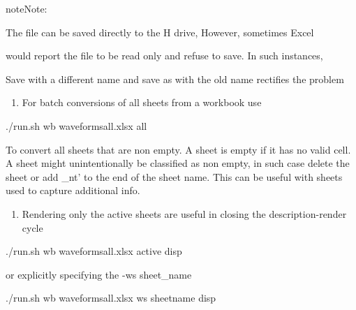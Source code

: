 \documentclass[letterpaper,10pt,english]{sphinxmanual}
\begin{document}
\begin{sphinxadmonition}{note}{Note:}
\begin{DUlineblock}{0em}
\item[] 
\item[]
\begin{DUlineblock}{\DUlineblockindent}
\item[] The file can be saved directly to the H drive, However, sometimes Excel
\item[] would report the file to be read only and refuse to save.  In such instances,
\item[] Save with a different name and save as with the old name rectifies the problem
\end{DUlineblock}
\end{DUlineblock}
\end{sphinxadmonition}
\begin{enumerate}
\item {} 
For batch conversions of all sheets from a workbook use

\end{enumerate}

%
\begin{sphinxVerbatim}[commandchars=\\\{\}]
./run.sh \PYGZhy{}wb waveforms\PYGZus{}all.xlsx \PYGZhy{}all
\end{sphinxVerbatim}

To convert all sheets that are non empty. A sheet is empty if it has
no valid cell.  A sheet might unintentionally be classified as non empty, in
such case delete the sheet or add \_nt’ to the end of the sheet name. This can
be useful with sheets used to capture additional info.
\begin{enumerate}
\item {} 
Rendering only the active sheets are useful in closing the description-render cycle

\end{enumerate}

%
\begin{sphinxVerbatim}[commandchars=\\\{\}]
./run.sh \PYGZhy{}wb waveforms\PYGZus{}all.xlsx \PYGZhy{}active \PYGZhy{}disp
\end{sphinxVerbatim}

or explicitly specifying the -ws sheet\_name

%
\begin{sphinxVerbatim}[commandchars=\\\{\}]
./run.sh \PYGZhy{}wb waveforms\PYGZus{}all.xlsx \PYGZhy{}ws \PYGZlt{}sheet\PYGZus{}name\PYGZgt{} \PYGZhy{}disp
\end{sphinxVerbatim}
\end{document}
